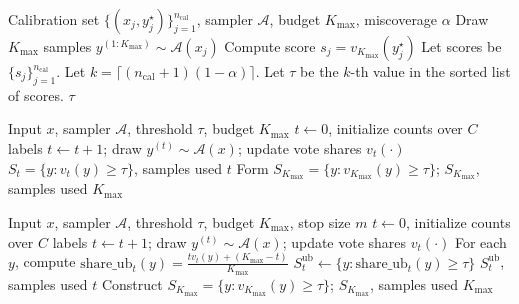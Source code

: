 \documentclass[11pt]{article}
\begin{document}
\vspace{0.5em}
\begin{algorithm}[htbp]
\caption{Split-Conformal Calibration of $\tau$ at $K_{\max}$}
\label{alg:calib}
\begin{algorithmic}[1]
\Require Calibration set $\{(x_j,y^\star_j)\}_{j=1}^{n_{\mathrm{cal}}}$, sampler $\mathcal{A}$, budget $K_{\max}$, miscoverage $\alpha$
  \State Draw $K_{\max}$ samples $y^{(1:K_{\max})}\sim \mathcal{A}(x_j)$
  \State Compute score $s_j = v_{K_{\max}}(y^\star_j)$
\EndFor
\State Let scores be $\{s_j\}_{j=1}^{n_{\mathrm{cal}}}$.
\State Let $k = \lceil (n_{\mathrm{cal}}+1)(1-\alpha) \rceil$.
\State Let $\tau$ be the $k$-th value in the sorted list of scores.
\State \Return $\tau$
\end{algorithmic}
\end{algorithm}
\vspace{0.5em}

\vspace{0.5em}
\begin{algorithm}[htbp]
\caption{Naive ACSC (Heuristic; No Coverage Guarantee)}
\label{alg:naive}
\begin{algorithmic}[1]
\Require Input $x$, sampler $\mathcal{A}$, threshold $\tau$, budget $K_{\max}$
\State $t\gets 0$, initialize counts over $C$ labels
  \State $t\gets t+1$; draw $y^{(t)}\sim \mathcal{A}(x)$; update vote shares $v_t(\cdot)$
    \State \Return $S_t = \{y: v_t(y)\ge \tau\}$, samples used $t$
  \EndIf
\EndWhile
\State Form $S_{K_{\max}} = \{y : v_{K_{\max}}(y)\ge \tau\}$; \Return $S_{K_{\max}}$, samples used $K_{\max}$
\end{algorithmic}
\end{algorithm}
\vspace{0.5em}

\vspace{0.5em}
\begin{algorithm}[htbp]
\caption{ACSC-UB (Safe Superset; Coverage-Preserving)}
\label{alg:ub}
\begin{algorithmic}[1]
\Require Input $x$, sampler $\mathcal{A}$, threshold $\tau$, budget $K_{\max}$, stop size $m$
\State $t\gets 0$, initialize counts over $C$ labels
  \State $t\gets t+1$; draw $y^{(t)}\sim \mathcal{A}(x)$; update vote shares $v_t(\cdot)$
  \State For each $y$, compute $\text{share\_ub}_t(y) = \frac{t v_t(y) + (K_{\max}-t)}{K_{\max}}$
  \State $S^{\text{ub}}_t \gets \{ y : \text{share\_ub}_t(y) \ge \tau \}$
    \State \Return $S^{\text{ub}}_t$, samples used $t$
  \EndIf
\EndWhile
\State Construct $S_{K_{\max}} = \{y : v_{K_{\max}}(y)\ge \tau\}$; \Return $S_{K_{\max}}$, samples used $K_{\max}$
\end{algorithmic}
\end{algorithm}
\vspace{0.5em}
\end{document}
